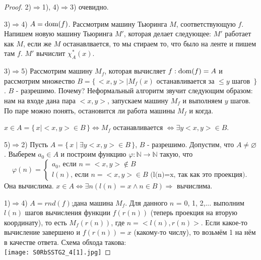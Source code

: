 \begin{proof}
	\par2)$\Rightarrow$1), 4)$\Rightarrow$3) очевидно.
	\par3)$\Rightarrow$4) $A=\operatorname{dom}(f)$. Рассмотрим машину Тьюринга $M$, соответствующую $f$. Напишем новую машину
	Тьюринга $M'$, которая делает следующее: $M'$ работает как $M$, если же $M$ останавлвается, то мы стираем то,
	что было на ленте и пишем там $f$. $M'$ вычислит $\chi^*_{A}(x)$.  
	\par3)$\Rightarrow$5) Рассмотрим машину $M_{f}$, которая вычисляет $f: \operatorname{dom}(f)=A$ и рассмотрим множество $B =
	\{\,<x,y>\mid M_{f}(x)\mbox{ останавливается за }\leq y\mbox{ шагов }\,\}$. $B$ - разрешимо. Почему?
	Неформальный алгоритм звучит следующим образом: нам на входе дана пара $<x,y>$, запускаем машину $M_{f}$ и
	выполняем $y$ шагов. По паре можно понять, остановится ли работа машины $M_{f}$ и когда.
	\par $x \in A = \{\,x\mid <x,y> \in B \,\} \iff M_{f}$ останавливается $\iff \exists y <x,y> \in B $.
	\par5)$\Rightarrow$2) Пусть $A = \{\,x\mid \exists y <x,y> \in B\,\}$, $B$ - разрешимо. Допустим, что $A \neq
	\varnothing$. Выберем $a_{0} \in A$ и построим функцию $\varphi: \mathbb{N} \to \mathbb{N}$ такую, что 
	\begin{equation*}
		\varphi(n) = 
		\begin{cases}
			a_{0}\text{, если $n=<x,y> \notin B$}\\
			l(n)\text{, если $n=<x,y> \in B$ (l(n)=x, так как это проекция)}.
		\end{cases}
	\end{equation*}
	Она вычислима. $x \in A \iff \exists n (l(n)=x \land n \in B) \Rightarrow$ вычислима.
	\par1)$\Rightarrow$4) $A = rnd(f)$;дана машина $M_{f}$. Для данного $n$ = 0, 1, 2,... выполним $l(n)$ шагов
	вычисления функции $f(r(n))$ (теперь проекция на вторую координату), то есть $M_{f}(r(n))$, где $n = <l(n),
	r(n)>$. Если какое-то вычисление завершено и $f(r(n))=x$ (какому-то числу), то возьмём 1 на нём в качестве
	ответа. Схема обхода такова: \\ 
	\texttt{[image: S0RbSSTG2\_4[1].jpg]}
\end{proof}
